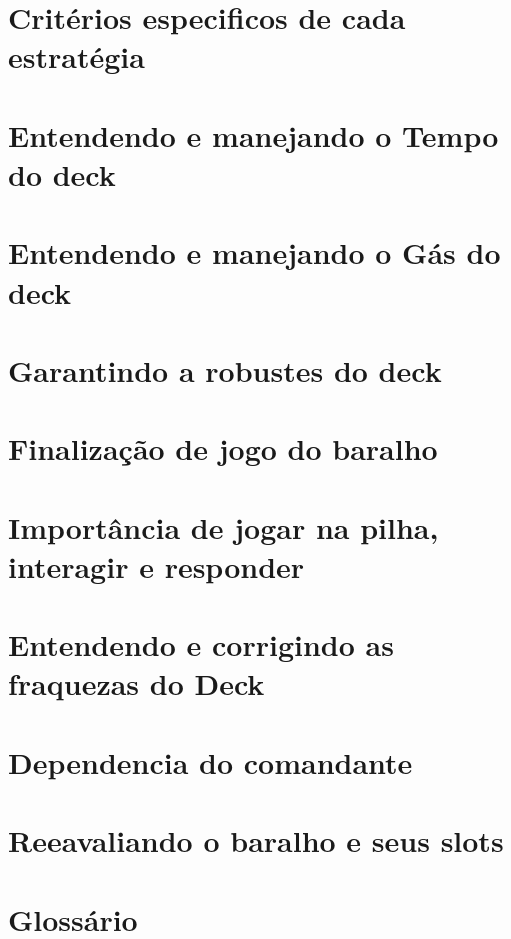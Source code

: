 \documentclass[12pt, a4paper]{article}
\begin{document}
    \section{Critérios especificos de cada estratégia}
    

    \section{Entendendo e manejando o Tempo do deck}
    

    \section{Entendendo e manejando o Gás do deck}
    

    \section{Garantindo a robustes do deck}
    

    \section{Finalização de jogo do baralho}
    

    \section{Importância de jogar na pilha, interagir e responder}
    

    \section{Entendendo e corrigindo as fraquezas do Deck}
    

    \section{Dependencia do comandante}
    

    \section{Reeavaliando o baralho e seus slots}
    

    \section{Glossário}
    

    
\end{document}

